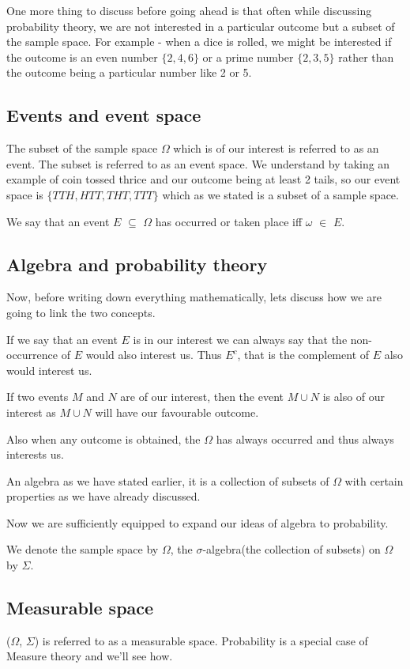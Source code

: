 \documentclass{article}
\begin{document}
One more thing to discuss before going ahead is that often while discussing probability theory, we are not interested in a particular outcome but a subset of the sample space. For example - when a dice is rolled, we might be interested if the outcome is an even number $\{2,4,6\}$ or a prime number $\{2,3,5\}$ rather than the outcome being a particular number like 2 or 5.

\subsection{Events and event space}
The subset of the sample space $\Omega$ which is of our interest is referred to as an event. The subset is referred to as an event space.
We understand by taking an example of coin tossed thrice and our outcome being at least 2 tails, so our event space is $\{TTH, HTT, THT, TTT\}$ which as we stated is a subset of a sample space. 

We say that an event $E$ $\subseteq$ $\Omega$ has occurred or taken place iff $\omega$ $\in$ $E$.

\subsection{Algebra and probability theory}

Now, before writing down everything mathematically, lets discuss how we are going to link the two concepts.

If we say that an event $E$ is in our interest we can always say that the non-occurrence of $E$ would also interest us. Thus $E^{c}$, that is the complement of $E$ also would interest us.

If two events $M$ and $N$ are of our interest, then the event $M\cup N$ is also of our interest as  $M\cup N$ will have our favourable outcome.

Also when any outcome is obtained, the $\Omega$ has always occurred and thus always interests us.

An algebra as we have stated earlier, it is a collection of subsets of $\Omega$ with certain properties as we have already discussed.

Now we are sufficiently equipped to expand our ideas of algebra to probability.

We denote the sample space by $\Omega$, the $\sigma$-algebra(the collection of subsets) on $\Omega$ by $\Sigma$.

\subsection{Measurable space}
($\Omega$, $\Sigma$) is referred to as a measurable space.
Probability is a special case of Measure theory and we'll see how.
\bigskip
\end{document}
